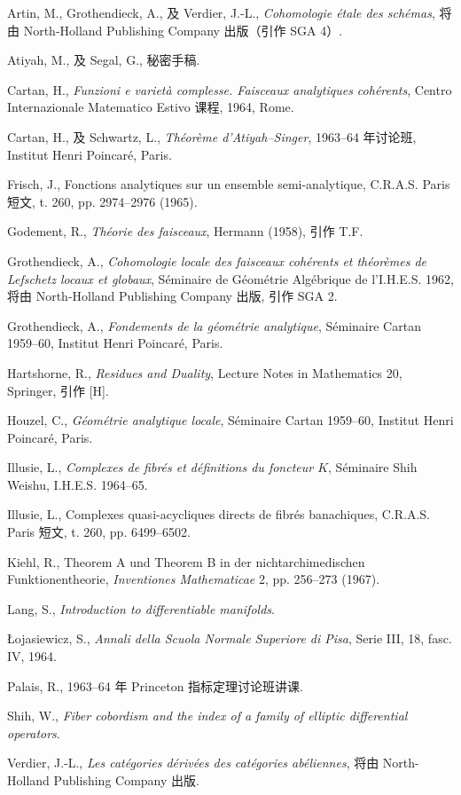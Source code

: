 \begin{enumerate}[label={[\,\arabic*\,]}]
\item Artin, M., Grothendieck, A., 及 Verdier, J.-L., \emph{Cohomologie étale des schémas}, 将由 North-Holland Publishing Company 出版（引作 SGA 4）.
\item Atiyah, M., 及 Segal, G., 秘密手稿.
\item Cartan, H., \emph{Funzioni e varietà complesse. Faisceaux analytiques cohérents}, Centro Internazionale Matematico Estivo 课程, 1964, Rome.
\item Cartan, H., 及 Schwartz, L., \emph{Théorème d'Atiyah--Singer}, 1963--64 年讨论班, Institut Henri Poincaré, Paris.
\item Frisch, J., Fonctions analytiques sur un ensemble semi-analytique, C.R.A.S. Paris 短文, t. 260, pp. 2974--2976 (1965).
\item Godement, R., \emph{Théorie des faisceaux}, Hermann (1958), 引作 T.F.
\item Grothendieck, A., \emph{Cohomologie locale des faisceaux cohérents et théorèmes de Lefschetz locaux et globaux}, Séminaire de Géométrie Algébrique de l'I.H.E.S. 1962, 将由 North-Holland Publishing Company 出版, 引作 SGA 2.
\item Grothendieck, A., \emph{Fondements de la géométrie analytique}, Séminaire Cartan 1959--60, Institut Henri Poincaré, Paris.
\item Hartshorne, R., \emph{Residues and Duality}, Lecture Notes in Mathematics 20, Springer, 引作 [H].
\item Houzel, C., \emph{Géométrie analytique locale}, Séminaire Cartan 1959--60, Institut Henri Poincaré, Paris.
\item Illusie, L., \emph{Complexes de fibrés et définitions du foncteur $K$}, Séminaire Shih Weishu, I.H.E.S. 1964--65.
\item Illusie, L., Complexes quasi-acycliques directs de fibrés banachiques, C.R.A.S. Paris 短文, t. 260, pp. 6499--6502.
\item Kiehl, R., Theorem A und Theorem B in der nichtarchimedischen Funktionentheorie, \emph{Inventiones Mathematicae} 2, pp. 256--273 (1967).
\item Lang, S., \emph{Introduction to differentiable manifolds}.
\item Łojasiewicz, S., \emph{Annali della Scuola Normale Superiore di Pisa}, Serie III, 18, fasc. IV, 1964.
\item Palais, R., 1963--64 年 Princeton 指标定理讨论班讲课.
\item Shih, W., \emph{Fiber cobordism and the index of a family of elliptic differential operators}.
\item Verdier, J.-L., \emph{Les catégories dérivées des catégories abéliennes}, 将由 North-Holland Publishing Company 出版.
\end{enumerate}




